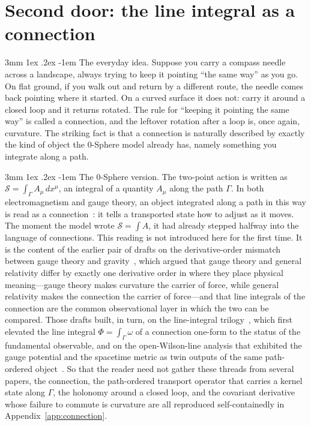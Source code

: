 \documentclass[%
 reprint, amsmath,amssymb, aps, prb, ]{revtex4-2}
\makeatletter
\numberwithin{equation}{section}
\renewcommand\paragraph{%
  \@startsection{paragraph}{4}{\z@}%
    {3mm \@plus 1ex \@minus .2ex}%
    {-1em}%
    {\normalfont\normalsize\itshape}}
\makeatother
\begin{document}
\section{Second door: the line integral as a connection}
\label{sec:connection}

\paragraph{The everyday idea.}
Suppose you carry a compass needle across a landscape, always trying to keep it pointing ``the same way'' as you go. On flat ground, if you walk out and return by a different route, the needle comes back pointing where it started. On a curved surface it does not: carry it around a closed loop and it returns rotated. The rule for ``keeping it pointing the same way'' is called a connection, and the leftover rotation after a loop is, once again, curvature. The striking fact is that a connection is naturally described by exactly the kind of object the 0-Sphere model already has, namely something you integrate along a path.

\paragraph{The 0-Sphere version.}
The two-point action is written as $\mathcal{S}=\int_\Gamma A_\mu\,dx^\mu$, an integral of a quantity $A_\mu$ along the path $\Gamma$. In both electromagnetism and gauge theory, an object integrated along a path in this way is read as a connection~\cite{WuYang1975,AharonovBohm1959,Berry1984}: it tells a transported state how to adjust as it moves. The moment the model wrote $\mathcal{S}=\int A$, it had already stepped halfway into the language of connections. This reading is not introduced here for the first time. It is the content of the earlier pair of drafts on the derivative-order mismatch between gauge theory and gravity~\cite{hanamura40,hanamura41}, which argued that gauge theory and general relativity differ by exactly one derivative order in where they place physical meaning---gauge theory makes curvature the carrier of force, while general relativity makes the connection the carrier of force---and that line integrals of the connection are the common observational layer in which the two can be compared. Those drafts built, in turn, on the line-integral trilogy~\cite{hanamura29,hanamura30,hanamura31}, which first elevated the line integral $\Phi=\int_\Gamma\omega$ of a connection one-form to the status of the fundamental observable, and on the open-Wilson-line analysis that exhibited the gauge potential and the spacetime metric as twin outputs of the same path-ordered object~\cite{hanamura55}. So that the reader need not gather these threads from several papers, the connection, the path-ordered transport operator that carries a kernel state along $\Gamma$, the holonomy around a closed loop, and the covariant derivative whose failure to commute is curvature are all reproduced self-containedly in Appendix~\ref{app:connection}.
\end{document}
